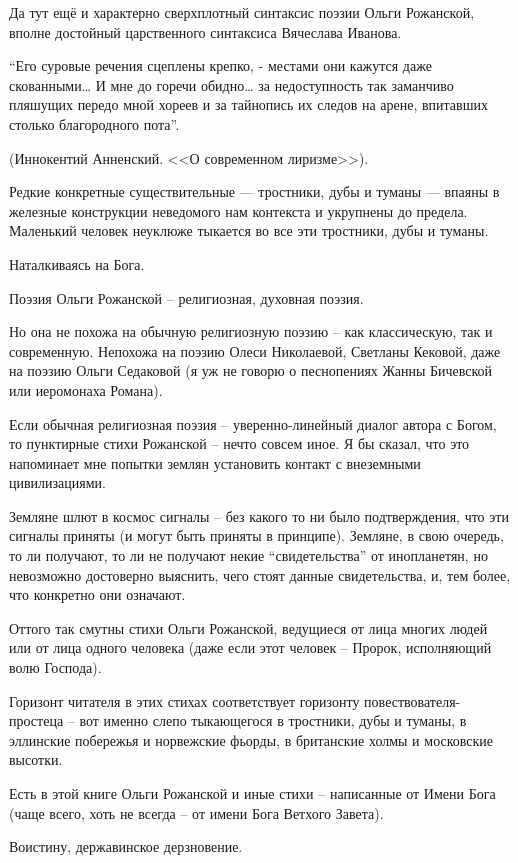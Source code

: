 \documentclass[12pt,a5paper,twoside]{article}
\begin{document}
Да тут ещё и характерно сверхплотный синтаксис поэзии Ольги Рожанской, вполне достойный царственного синтаксиса Вячеслава Иванова.

``Его суровые речения сцеплены крепко, - местами они кажутся даже скованными… И мне до горечи обидно… за недоступность так заманчиво пляшущих передо мной хореев и за 
тайнопись их следов на арене, впитавших столько благородного пота''.

(Иннокентий Анненский. <<О современном лиризме>>).

Редкие конкретные существительные --- тростники, дубы и туманы --- впаяны в железные 
конструкции неведомого нам контекста и укрупнены до предела. 
Маленький человек неуклюже тыкается во все эти тростники, дубы и туманы.

Наталкиваясь на Бога.

Поэзия Ольги Рожанской -- религиозная, духовная поэзия.

Но она не похожа на обычную религиозную поэзию -- как классическую, так и современную. 
Непохожа на поэзию Олеси Николаевой, Светланы Кековой, даже на поэзию Ольги Седаковой 
(я уж не говорю о песнопениях Жанны Бичевской или иеромонаха Романа).

Если обычная религиозная поэзия -- уверенно-линейный диалог автора с Богом, 
то пунктирные стихи Рожанской -- нечто совсем иное. Я бы сказал, что это напоминает
мне попытки землян установить контакт с внеземными цивилизациями.

Земляне шлют в космос сигналы -- без какого то ни было подтверждения, 
что эти сигналы приняты (и могут быть приняты в принципе). Земляне, 
в свою очередь, то ли получают, то ли не получают некие ``свидетельства'' 
от инопланетян, но невозможно достоверно выяснить, чего стоят 
данные свидетельства, и, тем более, что конкретно они означают.

Оттого так смутны стихи Ольги Рожанской, ведущиеся от лица многих
людей или от лица одного человека (даже если этот человек -- Пророк, исполняющий волю Господа).

Горизонт читателя в этих стихах соответствует горизонту по\-вест\-во\-ва\-те\-ля-простеца -- вот 
именно слепо тыкающегося в тростники, дубы и туманы, в эллинские побережья и 
норвежские фьорды, в британские холмы и московские высотки.

Есть в этой книге Ольги Рожанской и иные стихи -- написанные
от Имени Бога (чаще всего, хоть не всегда -- от имени Бога Ветхого Завета).

Воистину, державинское дерзновение.
\end{document}
